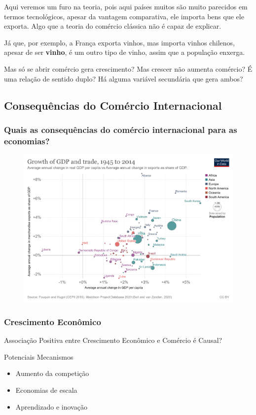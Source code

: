 \documentclass[a4paper,12pt]{article}[abntex2]
\begin{document}
Aqui veremos um furo na teoria, pois aqui países muitos são muito parecidos em termos tecnológicos, apesar da vantagem comparativa, ele importa bens que ele exporta. Algo que a teoria do comércio clássica não é capaz de explicar.

Já que, por exemplo, a França exporta vinhos, mas importa vinhos chilenos, apesar de ser \textbf{vinho}, é um outro tipo de vinho, assim que a população enxerga.

Mas só se abrir comércio gera crescimento? Mas crescer não aumenta comércio? É uma relação de sentido duplo? Há alguma variável secundária que gera ambos? 

\subsection{\textbf{Consequências do Comércio Internacional}}
\subsubsection{\textbf{Quais as consequências do comércio internacional para as economias?}}
\begin{figure}
    \centering
    \includegraphics[width=0.70\linewidth]{Imagens/a1i13.png}
\end{figure}

\subsubsection{\textbf{Crescimento Econômico}}
Associação Positiva entre Crescimento Econômico e Comércio é Causal?

Potenciais Mecanismos
\begin{itemize}
    \item Aumento da competição
    \item Economias de escala
    \item Aprendizado e inovação
\end{itemize}
\end{document}
